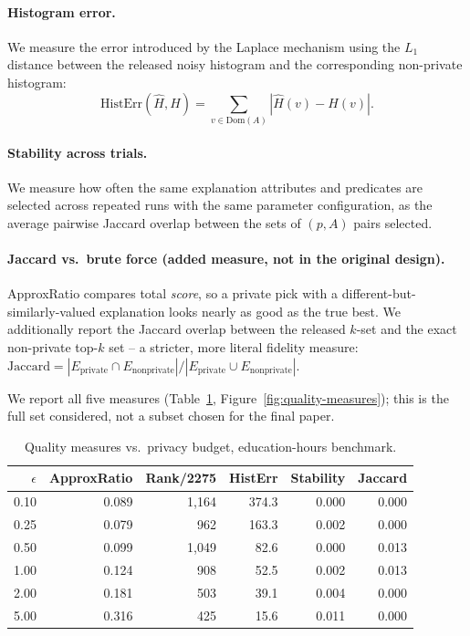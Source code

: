 \paragraph{Histogram error.}
We measure the error introduced by the Laplace mechanism using the $L_1$ distance
between the released noisy histogram and the corresponding non-private histogram:
\[
    \mathrm{HistErr}(\widehat{H}, H)
    =
    \sum_{v \in \mathrm{Dom}(A)} |\widehat{H}(v) - H(v)|.
\]

\paragraph{Stability across trials.}
We measure how often the same explanation attributes and predicates are selected
across repeated runs with the same parameter configuration, as the average
pairwise Jaccard overlap between the sets of $(p,A)$ pairs selected.

\paragraph{Jaccard vs.\ brute force (added measure, not in the original
design).} ApproxRatio compares total \emph{score}, so a private pick with
a different-but-similarly-valued explanation looks nearly as good as the
true best. We additionally report the Jaccard overlap between the
released $k$-set and the exact non-private top-$k$ set -- a stricter,
more literal fidelity measure:
$\mathrm{Jaccard} = |E_{\mathrm{private}} \cap E_{\mathrm{nonprivate}}| /
|E_{\mathrm{private}} \cup E_{\mathrm{nonprivate}}|$.

We report all five measures (Table~\ref{tab:quality-measures},
Figure~\ref{fig:quality-measures}); this is the full set considered,
not a subset chosen for the final paper.

\begin{table}[t]
\centering
\caption{Quality measures vs.\ privacy budget, education-hours benchmark.}
\label{tab:quality-measures}
\small
\begin{tabular}{@{}rrrrrr@{}}
\toprule
$\epsilon$ & ApproxRatio & Rank/2275 & HistErr & Stability & Jaccard \\
\midrule
0.10 & 0.089 & 1{,}164 & 374.3 & 0.000 & 0.000 \\
0.25 & 0.079 & 962     & 163.3 & 0.002 & 0.000 \\
0.50 & 0.099 & 1{,}049 & 82.6  & 0.000 & 0.013 \\
1.00 & 0.124 & 908     & 52.5  & 0.002 & 0.013 \\
2.00 & 0.181 & 503     & 39.1  & 0.004 & 0.000 \\
5.00 & 0.316 & 425     & 15.6  & 0.011 & 0.000 \\
\bottomrule
\end{tabular}
\end{table}

